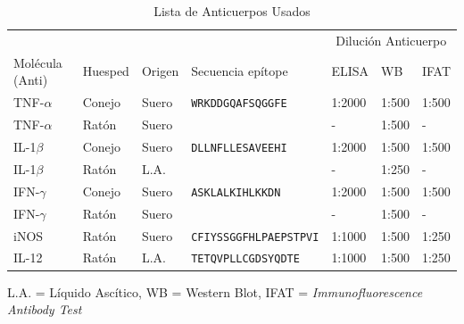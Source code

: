 \documentclass[12pt,letterpaper,oneside]{scrbook}
\begin{document}
\begin{table}[h!]
    \sffamily
    \begin{center}
        \begin{threeparttable}
        \caption{Lista de Anticuerpos Usados}\label{tabla:anticuerpos}
            \begin{tabularx}{16cm}{l l l X l l l}
                \toprule
                \multicolumn{4}{c}{} & \multicolumn{3}{c}{Dilución Anticuerpo} \\
                \cmidrule(r){5-7}
                Molécula (Anti) & Huesped & Origen & Secuencia epítope & ELISA & WB & IFAT \\
                \midrule
                TNF-$\alpha$ & Conejo & Suero & \texttt{WRKDDGQAFSQGGFE} & 1:2000 & 1:500 & 1:500 \\
                TNF-$\alpha$ & Ratón & Suero & \texttt{ } & - & 1:500 & - \\
                IL-1$\beta$ & Conejo & Suero &  \texttt{DLLNFLLESAVEEHI} & 1:2000 & 1:500 & 1:500 \\
                IL-1$\beta$ & Ratón & L.A. & \texttt{} & - & 1:250 & - \\
                IFN-$\gamma$ & Conejo & Suero & \texttt{ASKLALKIHLKKDN} & 1:2000 & 1:500 & 1:500 \\
                IFN-$\gamma$ & Ratón & Suero & \texttt{ } & - & 1:500 & - \\
                iNOS & Ratón & Suero & \texttt{CFIYSSGGFHLPAEPSTPVI} & 1:1000 & 1:500 & 1:250 \\
                IL-12 & Ratón & L.A. & \texttt{TETQVPLLCGDSYQDTE} & 1:1000 & 1:500 & 1:250 \\
                \bottomrule
            \end{tabularx}
            \begin{tablenotes}
                \item *L.A. = Líquido Ascítico, WB = Western Blot, IFAT = \emph{Immunofluorescence Antibody Test}
            \end{tablenotes}
        \end{threeparttable}
    \end{center}
\end{table}
\end{document}
